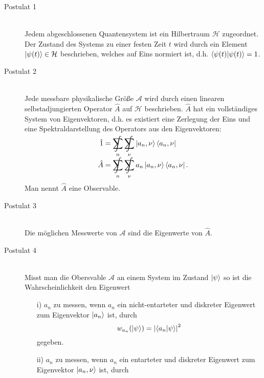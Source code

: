 \documentclass[11pt]{article}
\DeclareMathOperator*{\SumInt}{%
\mathchoice%
  {\ooalign{$\displaystyle\sum$\cr\hidewidth$\displaystyle\int$\hidewidth\cr}}
  {\ooalign{\raisebox{.14\height}{\scalebox{.7}{$\textstyle\sum$}}\cr\hidewidth$\textstyle\int$\hidewidth\cr}}
  {\ooalign{\raisebox{.2\height}{\scalebox{.6}{$\scriptstyle\sum$}}\cr$\scriptstyle\int$\cr}}
  {\ooalign{\raisebox{.2\height}{\scalebox{.6}{$\scriptstyle\sum$}}\cr$\scriptstyle\int$\cr}}
}
\numberwithin{equation}{section}
\begin{document}
      \begin{description} %
        \item[Postulat 1]\hfill \\
          Jedem abgeschlossenen Quantensystem ist ein Hilbertraum $\mathcal{H}$ zugeordnet. Der Zustand des Systems zu einer festen Zeit $t$ wird durch ein Element $\Ket{\psi(t)} \in \mathcal{H}$ beschrieben, welches auf Eins normiert ist, d.h. $\braket{\psi(t)|\psi(t)} = 1$.
        \item[Postulat 2]\hfill \\
          Jede messbare physikalische Größe $\mathcal{A}$ wird durch einen linearen selbstadjungierten Operator $\hat{A}$ auf $\mathcal{H}$ beschrieben. $\hat{A}$ hat ein vollständiges System von Eigenvektoren, d.h. es existiert eine Zerlegung der Eins und eine Spektraldarstellung des Operators aus den Eigenvektoren:
          \begin{equation}
            \begin{aligned}
              \hat{1} &= \SumInt_n \SumInt_\nu \Ket{a_n,\nu}\Bra{a_n,\nu} \\
              \hat{A} &= \SumInt_n \SumInt_\nu a_n\Ket{a_n,\nu}\Bra{a_n,\nu}. \\
            \end{aligned}
          \end{equation}
          Man nennt $\hat{A}$ eine Observable.
        \item[Postulat 3]\hfill \\
          Die möglichen Messwerte von $\mathcal{A}$ sind die Eigenwerte von $\hat{A}$.
        \item[Postulat 4]\hfill \\
          Misst man die Obersvable $\mathcal{A}$ an einem System im Zustand $\Ket{\psi}$ so ist die Wahrscheinlichkeit den Eigenwert
          \begin{itemize}
            \item[i)] $a_n$ zu messen, wenn $a_n$ ein nicht-entarteter und diskreter Eigenwert zum Eigenvektor $\Ket{a_n}$ ist, durch
            \begin{equation}
              w_{a_n}(\Ket{\psi}) = \left| \braket{a_n|\psi} \right|^2
            \end{equation}
            gegeben.
            \item[ii)] $a_n$ zu messen, wenn $a_n$ ein entarteter und diskreter Eigenwert zum Eigenvektor $\Ket{a_n,\nu}$ ist, durch
            \begin{equation}

\end{equation}
\end{itemize}
\end{description}
\end{document}
